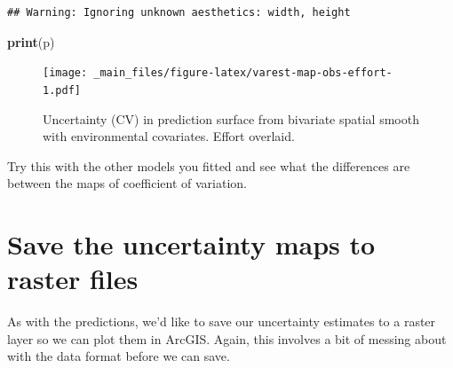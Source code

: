 \documentclass[]{book}
\newenvironment{Shaded}{\begin{snugshade}}{\end{snugshade}}
\newcommand{\KeywordTok}[1]{\textcolor[rgb]{0.13,0.29,0.53}{\textbf{#1}}}
\newcommand{\StringTok}[1]{\textcolor[rgb]{0.31,0.60,0.02}{#1}}
\newcommand{\CommentTok}[1]{\textcolor[rgb]{0.56,0.35,0.01}{\textit{#1}}}
\newcommand{\OtherTok}[1]{\textcolor[rgb]{0.56,0.35,0.01}{#1}}
\newcommand{\OperatorTok}[1]{\textcolor[rgb]{0.81,0.36,0.00}{\textbf{#1}}}
\newcommand{\NormalTok}[1]{#1}
\theoremstyle{definition}
\theoremstyle{definition}
\theoremstyle{remark}
\begin{document}
\begin{verbatim}
## Warning: Ignoring unknown aesthetics: width, height
\end{verbatim}

\begin{Shaded}
\begin{Highlighting}[]
\KeywordTok{print}\NormalTok{(p)}
\end{Highlighting}
\end{Shaded}

\begin{figure}
\centering
\texttt{[image: \_main\_files/figure-latex/varest-map-obs-effort-1.pdf]}
\caption{\label{fig:varest-map-obs-effort}Uncertainty (CV) in prediction
surface from bivariate spatial smooth with environmental covariates.
Effort overlaid.}
\end{figure}

Try this with the other models you fitted and see what the differences
are between the maps of coefficient of variation.

\section{Save the uncertainty maps to raster
files}\label{save-the-uncertainty-maps-to-raster-files}

As with the predictions, we'd like to save our uncertainty estimates to
a raster layer so we can plot them in ArcGIS. Again, this involves a bit
of messing about with the data format before we can save.

\begin{Shaded}
\end{Shaded}
\end{document}
